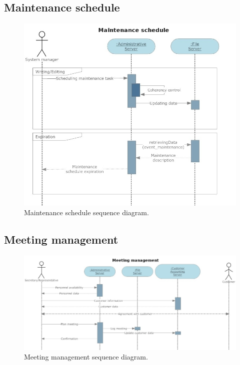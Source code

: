 \subsection{Maintenance schedule}
\begin{figure}
\begin{centering}
\includegraphics[scale=0.50]{assign3/sdraw/imgs/maintenance.jpg}
\caption{Maintenance schedule sequence diagram.}
\label{3img:[sequence]maintenance}
\end{centering}
\end{figure}

\subsection{Meeting management}
\begin{figure}
\begin{centering}
\includegraphics[scale=0.35]{assign3/sdraw/imgs/meeting.jpg}
\caption{Meeting management sequence diagram.}
\label{3img:[sequence]meeting}
\end{centering}
\end{figure}

